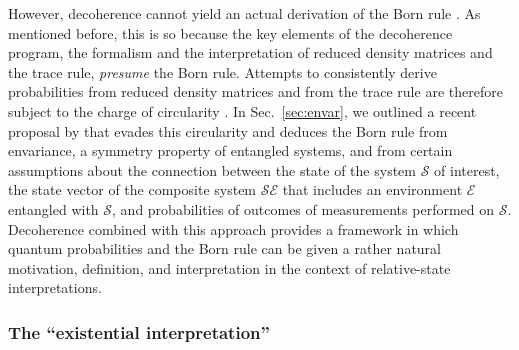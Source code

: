 \documentclass[rmp,aps,amsmath,amsfonts,noshowkeys,noshowpacs,12pt]{revtex4}
\begin{document}
However, decoherence cannot yield an actual derivation of the Born
rule \citep[for attempts in this direction,
see][]{Deutsch:1999:tz,Zurek:1998:re}.  As mentioned before, this is
so because the key elements of the decoherence program, the formalism
and the interpretation of reduced density matrices and the trace rule,
\emph{presume} the Born rule.  Attempts to consistently derive
probabilities from reduced density matrices and from the trace rule
are therefore subject to the charge of circularity
\citep{Zeh:1996:gy,Zurek:2002:ii}. In Sec.~\ref{sec:envar}, we
outlined a recent proposal by \citet{Zurek:2003:rv} that evades this
circularity and deduces the Born rule from envariance, a symmetry
property of entangled systems, and from certain assumptions about the
connection between the state of the system $\mathcal{S}$ of interest,
the state vector of the composite system $\mathcal{SE}$ that includes
an environment $\mathcal{E}$ entangled with $\mathcal{S}$, and
probabilities of outcomes of measurements performed on $\mathcal{S}$.
Decoherence combined with this approach provides a framework in which
quantum probabilities and the Born rule can be given a rather natural
motivation, definition, and interpretation in the context of
relative-state interpretations.


\subsubsection{\label{sec:exist-interpret}The ``existential
  interpretation''}
\end{document}
